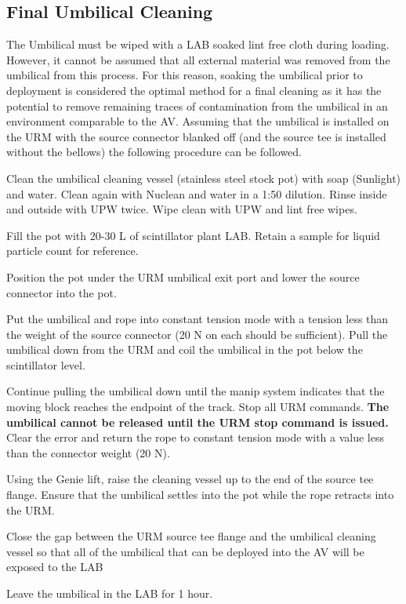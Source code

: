 \documentclass[11pt]{article}
\begin{document}
\subsection{Final Umbilical Cleaning}\label{ss:UmbClean}
The Umbilical must be wiped with a LAB soaked lint free cloth during
loading. However, it cannot be assumed that all external material was
removed from the umbilical from this process. For this reason, soaking
the umbilical prior to deployment is considered the optimal method for
a final cleaning as it has the potential to remove remaining traces of
contamination from the umbilical in an environment comparable to the
AV. Assuming that the umbilical is installed on the URM with the
source connector blanked off (and the source tee is installed without
the bellows) the following procedure can be followed.
\begin{answerlist}
\item Clean the umbilical cleaning vessel (stainless steel stock pot) with soap (Sunlight) and water. Clean again with Nuclean and water in a 1:50 dilution. Rinse inside and outside with UPW twice. Wipe clean with UPW and lint free wipes. 
\item Fill the pot with 20-30 L of scintillator plant LAB. Retain a sample for liquid particle count for reference.
\item Position the pot under the URM umbilical exit port and lower the source connector into the pot.
\item Put the umbilical and rope into constant tension mode with a tension less than the weight of the source connector (20 N on each should be sufficient). Pull the umbilical down from the URM and coil the umbilical in the pot below the scintillator level.
\item Continue pulling the umbilical down until the manip system
  indicates that the moving block reaches the endpoint of the
  track. Stop all URM commands. {\bf The umbilical cannot be released until
    the URM stop command is issued.} Clear the error and return the
  rope to constant tension mode with a value less than the connector
  weight (20 N).
\item Using the Genie lift, raise the cleaning vessel up to the end of the source tee flange. Ensure that the umbilical settles into the pot while the rope retracts into the URM.
\item Close the gap between the URM source tee flange and the umbilical cleaning vessel so that all of the umbilical that can be deployed into the AV will be exposed to the LAB
\item Leave the umbilical in the LAB for 1 hour. 

\end{answerlist}
\end{document}
